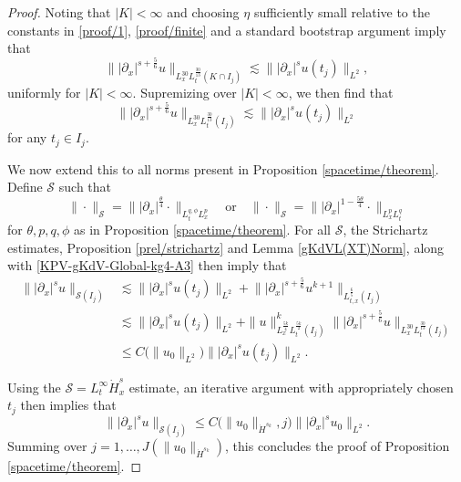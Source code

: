 \documentclass[10pt, reqno]{amsart}
\numberwithin{equation}{section}
\theoremstyle{definition}
\theoremstyle{remark}
\begin{document}
\begin{proof}
    Noting that $|K|<\infty$ and choosing $\eta$ sufficiently small relative to the constants in \eqref{proof/1}, \eqref{proof/finite} and a standard bootstrap argument imply that
    \begin{equation*}
        \big\||\partial_x|^{s + \frac{5}{6}} u\big\|_{L_x^{30}L_t^{\frac{30}{13}}(K \cap I_j)} \lesssim \big\| |\partial_x|^s u(t_j)\big\|_{L^2},
    \end{equation*}
    uniformly for $|K| < \infty$. Supremizing over $|K| < \infty$, we then find that
    \begin{equation*}
        \big\||\partial_x|^{s + \frac{5}{6}} u\big\|_{L_x^{30}L_t^{\frac{30}{13}}(I_j)} \lesssim \big\| |\partial_x|^s u(t_j)\big\|_{L^2}
    \end{equation*}
    for any $t_j \in I_j$.

    We now extend this to all norms present in Proposition \ref{spacetime/theorem}. Define $\mathcal{S}$ such that
    \begin{equation*}
        \|\cdot\|_{\mathcal{S}} = \big\||\partial_x|^{\frac{\theta}{4}} \cdot\big\|_{L_t^{q,\phi} L_x^{p}} \quad\text{or}\quad \|\cdot\|_{\mathcal{S}} = \big\||\partial_x|^{1 - \frac{5\theta}{4}}\cdot\big\|_{L_x^p L_t^q}
    \end{equation*}
    for $\theta, p, q, \phi$ as in Proposition \ref{spacetime/theorem}.
    For all $\mathcal{S}$, the Strichartz estimates, Proposition \ref{prel/strichartz} and Lemma \ref{gKdVL(XT)Norm}, along with \eqref{KPV-gKdV-Global-kg4-A3} then imply that
    \begin{align}
        \big\||\partial_x|^{s} u\big\|_{\mathcal{S}(I_j)} & \lesssim \big\| |\partial_x|^s u(t_j)\big\|_{L^2} + \big\| |\partial_x|^{s + \frac{5}{6}} u^{k+1}\big\|_{L_{t,x}^{\frac{6}{5}}(I_j)} \label{proof/8}\\
        & \lesssim \big\||\partial_x|^s u(t_j)\big\|_{L^2} + \|u\|^k_{L_x^\frac{5k}{4} L_t^\frac{5k}{2}(I_j)}\big\| |\partial_x|^{s + \frac{5}{6}} u\big\|_{L_x^{30} L_t^{\frac{30}{13}}(I_j)} \nonumber \\
        & \leq C\big(\|u_0\|_{L^2}\big)\big\| |\partial_x|^s u(t_j)\big\|_{L^2}. \nonumber
    \end{align}

    Using the $\mathcal{S} = L_t^\infty \dot{H}^s_x$ estimate, an iterative argument with appropriately chosen $t_j$ then implies that
    \begin{equation*}
        \big\||\partial_x|^{s} u\big\|_{\mathcal{S}(I_j)} \leq C\big(\|u_0\|_{\dot{H}^{s_k}},j\big)\big\| |\partial_x|^s u_0\big\|_{L^2}.
    \end{equation*}
    Summing over $j = 1,\dots,J(\|u_0\|_{\dot{H}^{s_k}})$, this concludes the proof of Proposition \ref{spacetime/theorem}.
\end{proof}
\end{document}
